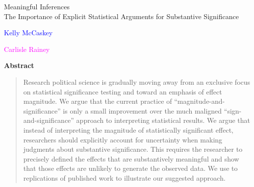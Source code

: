 \documentclass[12pt]{article}
\newcommand{\kelly}[1]{\textcolor{blue}{#1}}
\newcommand{\carlisle}[1]{\textcolor{magenta}{#1}}
\begin{document}
\begin{center}
{\LARGE Meaningful Inferences}\\\vspace{2mm}
{\large The Importance of Explicit Statistical Arguments for Substantive Significance}\\\vspace{2mm}


\vspace{10mm}

\kelly{Kelly McCaskey}

\vspace{3mm}

\carlisle{Carlisle Rainey}
\end{center}


\vspace{10mm}



{\centerline{\textbf{Abstract}}}
\begin{quote}\noindent
Research political science is gradually moving away from an exclusive focus on statistical significance testing and toward an emphasis of effect magnitude. We argue that the current practice of ``magnitude-and-significance'' is only a small improvement over the much maligned ``sign-and-significance'' approach to interpreting statistical results. We argue that instead of interpreting the magnitude of statistically significant effect, researchers should explicitly account for uncertainty when making judgments about substantive significance. This requires the researcher to precisely defined the effects that are substantively meaningful and show that those effects are unlikely to generate the observed data. We use to replications of published work to illustrate our suggested approach.
 \end{quote}
\thispagestyle{empty}
\end{document}
